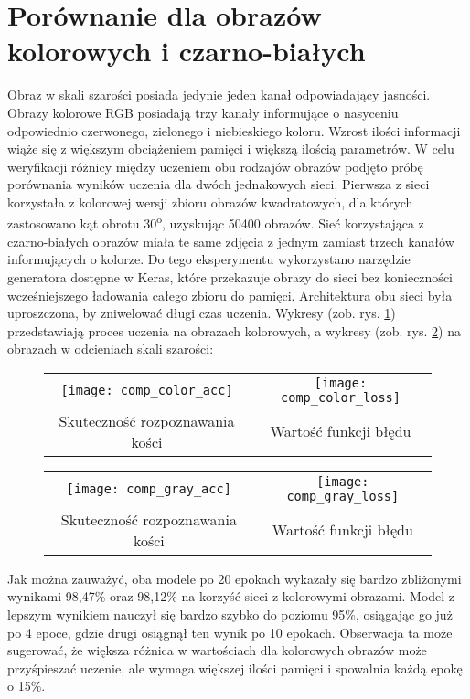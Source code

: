 \section{Porównanie dla obrazów kolorowych i czarno-białych}
Obraz w skali szarości posiada jedynie jeden kanał odpowiadający jasności. Obrazy kolorowe RGB
posiadają trzy kanały informujące o nasyceniu odpowiednio czerwonego, zielonego i niebieskiego koloru.
Wzrost ilości informacji wiąże się z większym obciążeniem pamięci i większą ilością parametrów.
W celu weryfikacji różnicy między uczeniem obu rodzajów obrazów podjęto próbę porównania wyników
uczenia dla dwóch jednakowych sieci. Pierwsza z sieci korzystała z kolorowej wersji zbioru
obrazów kwadratowych, dla których zastosowano kąt obrotu 30\textsuperscript{o}, uzyskując
50400 obrazów. Sieć korzystająca z czarno-białych obrazów miała te same zdjęcia z jednym
zamiast trzech kanałów informujących o kolorze. Do tego eksperymentu
wykorzystano narzędzie generatora dostępne w Keras, które przekazuje obrazy do sieci
bez konieczności wcześniejszego ładowania całego zbioru do pamięci. Architektura obu
sieci była uproszczona, by zniwelować długi czas uczenia. Wykresy (zob. rys. \ref{fig:comp_color}) przedstawiają
proces uczenia na obrazach kolorowych, a wykresy (zob. rys. \ref{fig:comp_gray}) na obrazach w odcieniach skali szarości:\\
\begin{figure}[h!]
\begin{center}
\begin{tabular}{cc}
\texttt{[image: comp\_color\_acc]} &
\texttt{[image: comp\_color\_loss]} \\
 Skuteczność rozpoznawania kości & Wartość funkcji błędu\\
\end{tabular}
\label{fig:comp_color}
\end{center}
\end{figure}
\begin{figure}[h!]
\begin{center}
\begin{tabular}{cc}
\texttt{[image: comp\_gray\_acc]} &
\texttt{[image: comp\_gray\_loss]} \\
 Skuteczność rozpoznawania kości & Wartość funkcji błędu\\
\end{tabular}
\label{fig:comp_gray}
\end{center}
\end{figure}\newpage
Jak można zauważyć, oba modele po 20 epokach wykazały się bardzo zbliżonymi wynikami 98,47\% oraz 98,12\%
na korzyść sieci z kolorowymi obrazami. Model z lepszym wynikiem nauczył się bardzo szybko
do poziomu 95\%, osiągając go już po 4 epoce, gdzie drugi osiągnął ten wynik po 10 epokach.
Obserwacja ta może sugerować, że większa różnica w wartościach dla kolorowych obrazów
może przyśpieszać uczenie, ale wymaga większej ilości pamięci i spowalnia każdą epokę o 15\%.

